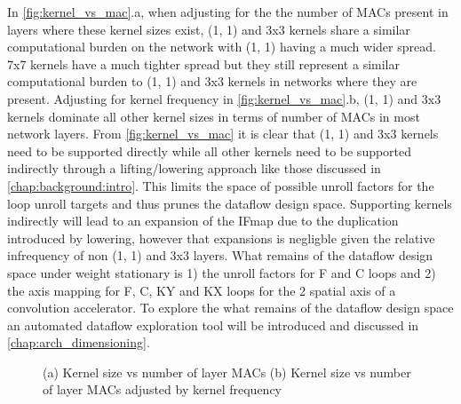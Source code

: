 In \autoref{fig:kernel_vs_mac}.a, when adjusting for the the number of MACs
present in layers where these kernel sizes exist, (1, 1) and 3x3 kernels share a
similar computational burden on the network with (1, 1) having a much wider spread.
7x7 kernels have a much tighter spread but they still represent a similar
computational burden to (1, 1) and 3x3 kernels in networks where they are present.
Adjusting for kernel frequency in \autoref{fig:kernel_vs_mac}.b, (1, 1) and 3x3
kernels dominate all other kernel sizes in terms of number of MACs in most
network layers. From \autoref{fig:kernel_vs_mac} it is clear that (1, 1) and 3x3
kernels need to be supported directly while all other kernels need to be
supported indirectly through a lifting/lowering approach like those discussed in
\autoref{chap:background:intro}. This limits the space of possible unroll
factors for the loop unroll targets and thus prunes the dataflow design space.
Supporting kernels indirectly will lead to an expansion of the IFmap due to the
duplication introduced by lowering, however that expansions is negligble given
the relative infrequency of non (1, 1) and 3x3 layers. What remains of the dataflow
design space under weight stationary is 1) the unroll factors for F and C loops
and 2) the axis mapping for F, C, KY and KX loops for the 2 spatial axis of a
convolution accelerator. To explore the what remains of the dataflow design
space an automated dataflow exploration tool will be introduced and discussed in
\autoref{chap:arch_dimensioning}.   

\clearpage
\begin{figure}
    \centering
    \caption{(a) Kernel size vs number of layer MACs  (b) Kernel size vs number of layer MACs adjusted by kernel frequency}
    \label{fig:kernel_vs_mac}
\end{figure}

